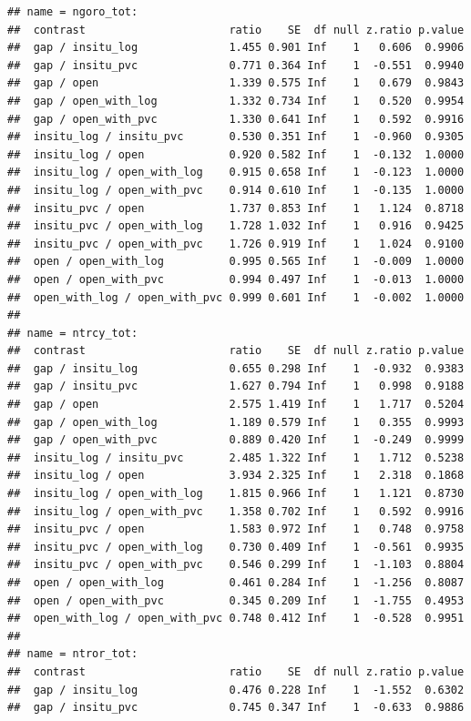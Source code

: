 \documentclass[
]{article}
\begin{document}
\begin{verbatim}
## name = ngoro_tot:
##  contrast                      ratio    SE  df null z.ratio p.value
##  gap / insitu_log              1.455 0.901 Inf    1   0.606  0.9906
##  gap / insitu_pvc              0.771 0.364 Inf    1  -0.551  0.9940
##  gap / open                    1.339 0.575 Inf    1   0.679  0.9843
##  gap / open_with_log           1.332 0.734 Inf    1   0.520  0.9954
##  gap / open_with_pvc           1.330 0.641 Inf    1   0.592  0.9916
##  insitu_log / insitu_pvc       0.530 0.351 Inf    1  -0.960  0.9305
##  insitu_log / open             0.920 0.582 Inf    1  -0.132  1.0000
##  insitu_log / open_with_log    0.915 0.658 Inf    1  -0.123  1.0000
##  insitu_log / open_with_pvc    0.914 0.610 Inf    1  -0.135  1.0000
##  insitu_pvc / open             1.737 0.853 Inf    1   1.124  0.8718
##  insitu_pvc / open_with_log    1.728 1.032 Inf    1   0.916  0.9425
##  insitu_pvc / open_with_pvc    1.726 0.919 Inf    1   1.024  0.9100
##  open / open_with_log          0.995 0.565 Inf    1  -0.009  1.0000
##  open / open_with_pvc          0.994 0.497 Inf    1  -0.013  1.0000
##  open_with_log / open_with_pvc 0.999 0.601 Inf    1  -0.002  1.0000
## 
## name = ntrcy_tot:
##  contrast                      ratio    SE  df null z.ratio p.value
##  gap / insitu_log              0.655 0.298 Inf    1  -0.932  0.9383
##  gap / insitu_pvc              1.627 0.794 Inf    1   0.998  0.9188
##  gap / open                    2.575 1.419 Inf    1   1.717  0.5204
##  gap / open_with_log           1.189 0.579 Inf    1   0.355  0.9993
##  gap / open_with_pvc           0.889 0.420 Inf    1  -0.249  0.9999
##  insitu_log / insitu_pvc       2.485 1.322 Inf    1   1.712  0.5238
##  insitu_log / open             3.934 2.325 Inf    1   2.318  0.1868
##  insitu_log / open_with_log    1.815 0.966 Inf    1   1.121  0.8730
##  insitu_log / open_with_pvc    1.358 0.702 Inf    1   0.592  0.9916
##  insitu_pvc / open             1.583 0.972 Inf    1   0.748  0.9758
##  insitu_pvc / open_with_log    0.730 0.409 Inf    1  -0.561  0.9935
##  insitu_pvc / open_with_pvc    0.546 0.299 Inf    1  -1.103  0.8804
##  open / open_with_log          0.461 0.284 Inf    1  -1.256  0.8087
##  open / open_with_pvc          0.345 0.209 Inf    1  -1.755  0.4953
##  open_with_log / open_with_pvc 0.748 0.412 Inf    1  -0.528  0.9951
## 
## name = ntror_tot:
##  contrast                      ratio    SE  df null z.ratio p.value
##  gap / insitu_log              0.476 0.228 Inf    1  -1.552  0.6302
##  gap / insitu_pvc              0.745 0.347 Inf    1  -0.633  0.9886

\end{verbatim}
\end{document}

